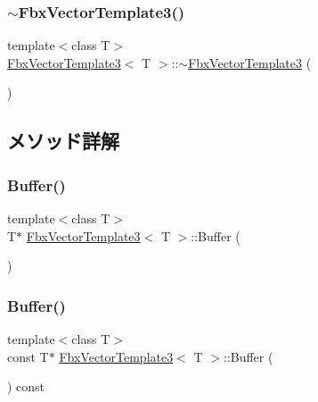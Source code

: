 \subsubsection{\texorpdfstring{$\sim$\+Fbx\+Vector\+Template3()}{~FbxVectorTemplate3()}}
{\footnotesize\ttfamily template$<$class T$>$ \\
\hyperlink{class_fbx_vector_template3}{Fbx\+Vector\+Template3}$<$ T $>$\+::$\sim$\hyperlink{class_fbx_vector_template3}{Fbx\+Vector\+Template3} (\begin{DoxyParamCaption}{ }\end{DoxyParamCaption})}



\subsection{メソッド詳解}
\mbox{\label{class_fbx_vector_template3_abff5302d7b86d9ae65615839bfb4458b}} 
\subsubsection{\texorpdfstring{Buffer()}{Buffer()}\hspace{0.1cm}{\footnotesize\ttfamily [1/2]}}
{\footnotesize\ttfamily template$<$class T$>$ \\
T$\ast$ \hyperlink{class_fbx_vector_template3}{Fbx\+Vector\+Template3}$<$ T $>$\+::Buffer (\begin{DoxyParamCaption}{ }\end{DoxyParamCaption})}

\mbox{\label{class_fbx_vector_template3_ae5a5582d606a687f346f470d94ff551d}} 
\subsubsection{\texorpdfstring{Buffer()}{Buffer()}\hspace{0.1cm}{\footnotesize\ttfamily [2/2]}}
{\footnotesize\ttfamily template$<$class T$>$ \\
const T$\ast$ \hyperlink{class_fbx_vector_template3}{Fbx\+Vector\+Template3}$<$ T $>$\+::Buffer (\begin{DoxyParamCaption}{ }\end{DoxyParamCaption}) const}

